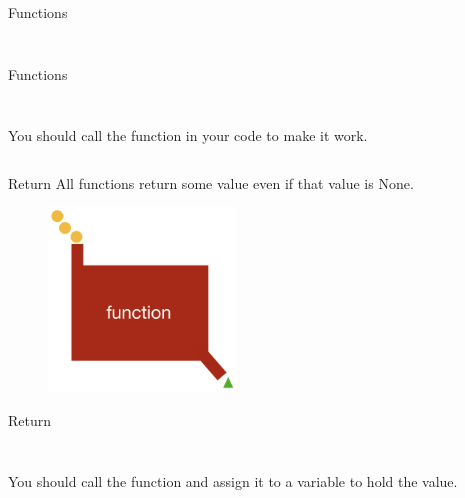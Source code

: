        \begin{frame}{Functions}
            \inputminted[frame=single,framesep=2pt, lastline=8]{python3}{code-examples/function_ex.py}
            \inputminted[frame=single,framesep=2pt, lastline=8]{python3}{code-examples/function_ex2.py}
        \end{frame}

        \begin{frame}{Functions}
            \begin{columns}
                \begin{column}{0.50\textwidth}
                \inputminted[frame=single,framesep=2pt, lastline=8]{python3}{code-examples/function_ex3.py}
                You should call the function in your code to make it work.
                \end{column}
                \begin{column}{0.50\textwidth}
                \inputminted[frame=single,framesep=2pt, lastline=15]{python3}{code-examples/function_ex4.py}
                \end{column}
            \end{columns}
        \end{frame}

        \begin{frame}{Return}
        All functions return some value even if that value is None.
            \begin{figure}[H]
                \centering
                \includegraphics[width=50mm]{code-examples/function.png}
                \end{figure}
        \end{frame}

        \begin{frame}{Return}
            \begin{columns}
                \begin{column}{0.50\textwidth}
                    \inputminted[frame=single,framesep=2pt, lastline=15]{python3}{code-examples/return1.py}
                    You should call the function and assign it to a variable to hold the value.
                \end{column}
                \begin{column}{0.50\textwidth}
                    \inputminted[frame=single,framesep=2pt, lastline=15]{python3}{code-examples/return1_1.py}
                \end{column}
            \end{columns}
        \end{frame}

